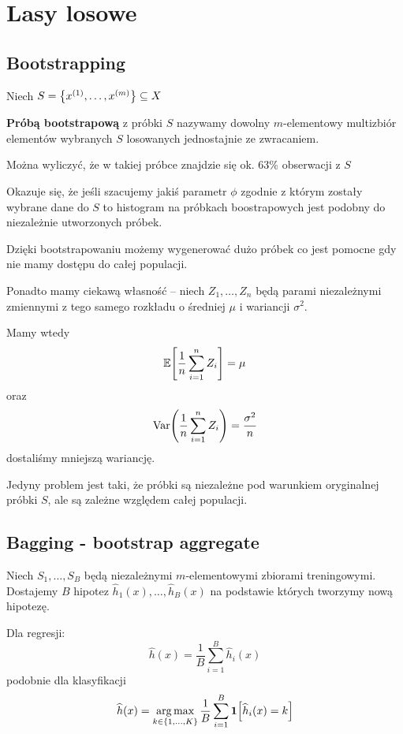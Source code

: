 \section{Lasy losowe}

\subsection{Bootstrapping}
\begin{definition}
	Niech \( S = \set{x^{(1)}, \dots, x^{(m)}} \subseteq X \)

	\textbf{Próbą bootstrapową} z próbki \( S \) nazywamy dowolny \( m \)-elementowy multizbiór elementów wybranych \( S \) losowanych jednostajnie ze zwracaniem.
\end{definition}

Można wyliczyć, że w takiej próbce znajdzie się ok. 63\% obserwacji z \( S \)

Okazuje się, że jeśli szacujemy jakiś parametr \( \phi \) zgodnie z którym zostały wybrane dane do \( S \) to histogram na próbkach boostrapowych jest podobny do niezależnie utworzonych próbek.

Dzięki bootstrapowaniu możemy wygenerować dużo próbek co jest pomocne gdy nie mamy dostępu do całej populacji.

Ponadto mamy ciekawą własność -- niech \( Z_1, \dots, Z_n \) będą parami niezależnymi zmiennymi z tego samego rozkładu o średniej \( \mu \) i wariancji \( \sigma^2 \).

Mamy wtedy
\[
	\expected{\frac{1}{n}\sum_{i=1}^n Z_i} = \mu
\]
oraz
\[
	\Var\pars{\frac{1}{n}\sum_{i=1}^n Z_i} = \frac{\sigma^2}{n}
\]
dostaliśmy mniejszą wariancję.

Jedyny problem jest taki, że próbki są niezależne pod warunkiem oryginalnej próbki \( S \), ale są zależne względem całej populacji.

\subsection{Bagging - bootstrap aggregate}
Niech \( S_1, \dots, S_B \) będą niezależnymi \( m \)-elementowymi zbiorami treningowymi.
Dostajemy \( B \) hipotez \( \widehat h_1(x), \dots, \widehat h_B(x) \) na podstawie których tworzymy nową hipotezę.

Dla regresji:
\[
	\widehat h(x) = \frac{1}{B} \sum_{i=1}^B \widehat h_i(x)
\]
podobnie dla klasyfikacji
\[
	\widehat h(x) = \argmax_{k \in \set{1, \dots, K}} \frac{1}{B} \sum_{i=1}^B \indicator{\widehat h_i(x) = k}
\]

